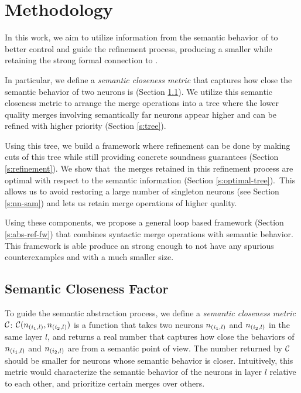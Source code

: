 \section{Methodology}

In this work, we aim to utilize information from the semantic behavior of \cnc
to better control and guide the refinement process, producing a smaller
\abs while retaining the strong formal connection to \abs. 

In particular, we define a \textit{semantic
closeness metric} that captures how close the semantic behavior of two 
neurons is (Section \ref{s:semantic-closeness}). We utilize this semantic
closeness metric to arrange the merge
operations into a tree where the lower quality merges involving semantically far
neurons appear higher and can be refined with higher priority (Section
\ref{s:tree}). 

Using this tree, we build a framework where refinement can be
done by making cuts of this tree while still providing concrete soundness
guarantees (Section \ref{s:refinement}). We show that the merges retained in
this refinement process are optimal with respect to the semantic information 
(Section \ref{s:optimal-tree}). This allows us to avoid restoring a large
number of singleton neurons (see Section \ref{s:nn-sam}) and lets us retain merge 
operations of higher quality.

Using these components, we propose a general \cegar loop based
framework (Section \ref{s:abs-ref-fw}) that combines syntactic merge operations 
with semantic behavior. This framework is able produce an \abs strong enough to
not have any spurious counterexamples and with a much smaller size.

\subsection{Semantic Closeness Factor}
\label{s:semantic-closeness}

To guide the semantic abstraction process, we define a \emph{semantic
closeness metric} $\mathcal{C}$: $\mathcal{C}(n_{(i_1,l)}, n_{(i_2,l)})$ is a function that
takes two neurons $n_{(i_1,l)}$ and $n_{(i_2,l)}$ in
the same layer $l$, and returns a real number that
captures how close the behaviors of $n_{(i_1,l)}$ and $n_{(i_2,l)}$ are from a
semantic point of view. The number returned by $\mathcal{C}$ should be smaller for
neurons whose semantic behavior is closer. Intuitively, this metric would
characterize the semantic behavior of the
neurons in layer $l$ relative to each other, and prioritize certain merges over
others. 

